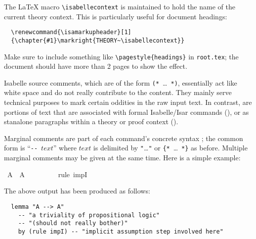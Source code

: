 \begin{isabellebody}
\begin{isamarkuptext}
  \medskip The {\LaTeX} macro \verb,\isabellecontext, is maintained to
  hold the name of the current theory context.  This is particularly
  useful for document headings:

\begin{verbatim}
  \renewcommand{\isamarkupheader}[1]
  {\chapter{#1}\markright{THEORY~\isabellecontext}}
\end{verbatim}

  \noindent Make sure to include something like
  \verb,\pagestyle{headings}, in \texttt{root.tex}; the document
  should have more than 2 pages to show the effect.%
\end{isamarkuptext}%
\isamarkuptrue%
%
\isamarkuptrue%
%
\begin{isamarkuptext}%
Isabelle source comments, which are of the form
  \verb,(,\verb,*,~\dots~\verb,*,\verb,),, essentially act like white
  space and do not really contribute to the content.  They mainly
  serve technical purposes to mark certain oddities in the raw input
  text.  In contrast,  are portions of text
  that are associated with formal Isabelle/Isar commands
  (), or as stanalone paragraphs within a
  theory or proof context ().

  \medskip Marginal comments are part of each command's concrete
  syntax \cite{isabelle-ref}; the common form is ``\verb,--,~$text$''
  where $text$ is delimited by \verb,",\dots\verb,", or
  \verb,{,\verb,*,~\dots~\verb,*,\verb,}, as before.  Multiple
  marginal comments may be given at the same time.  Here is a simple
  example:%
\end{isamarkuptext}%
\isamarkuptrue%
\ {\isachardoublequote}A\ {\isacharminus}{\isacharminus}{\isachargreater}\ A{\isachardoublequote}\isanewline
\ \ %
\isanewline
\ \ %
\isanewline
\ \ \isamarkupfalse%
\ {\isacharparenleft}rule\ impI{\isacharparenright}\ %
\isamarkupfalse%
%
\begin{isamarkuptext}%
\noindent The above output has been produced as follows:

\begin{verbatim}
  lemma "A --> A"
    -- "a triviality of propositional logic"
    -- "(should not really bother)"
    by (rule impI) -- "implicit assumption step involved here"
\end{verbatim}


\end{isamarkuptext}
\end{isabellebody}
